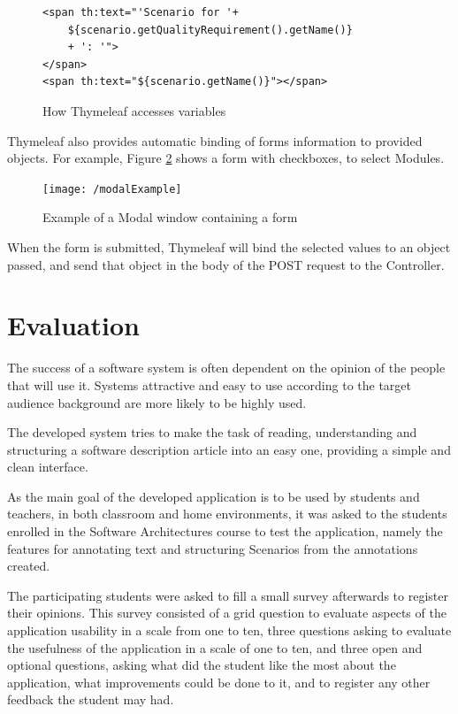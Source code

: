 \documentclass[conference]{IEEEtran}
\begin{document}
\begin{figure}
\lstset{style=customhtml}
\begin{lstlisting}
<span th:text="'Scenario for '+
	${scenario.getQualityRequirement().getName()}
	+ ': '">
</span> 
<span th:text="${scenario.getName()}"></span>
\end{lstlisting}
\caption{How Thymeleaf accesses variables}
\label{figure:viewsCallingMethods}
\end{figure}

Thymeleaf also provides automatic binding of forms information to provided objects. For example, Figure \ref{figure:viewsModalFormExample} shows a form with checkboxes, to select Modules.
\begin{figure}
\centering
\texttt{[image: /modalExample]}
\caption{Example of a Modal window containing a form}
\label{figure:viewsModalFormExample}
\end{figure}

When the form is submitted, Thymeleaf will bind the selected values to an object passed, and send that object in the body of the POST request to the Controller.

\section{Evaluation}
\label{evaluation}
The success of a software system is often dependent on the opinion of the people that will use it. Systems attractive and easy to use according to the target audience background are more likely to be highly used.

The developed system tries to make the task of reading, understanding and structuring a software description article into an easy one, providing a simple and clean interface.

As the main goal of the developed application is to be used by students and teachers, in both classroom and home environments, it was asked to the students enrolled in the Software Architectures course to test the application, namely the features for annotating text and structuring Scenarios from the annotations created.

The participating students were asked to fill a small survey afterwards to register their opinions.
This survey consisted of a grid question to evaluate aspects of the application usability in a scale from one to ten, three questions asking to evaluate the usefulness of the application in a scale of one to ten, and three open and optional questions, asking what did the student like the most about the application, what improvements could be done to it, and to register any other feedback the student may had.
\end{document}
